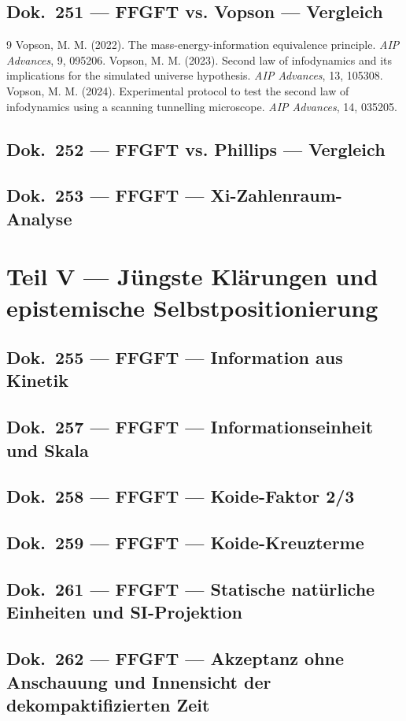	\chapter{Dok.~251 --- FFGFT vs. Vopson — Vergleich}
	
	\begin{thebibliography}{9}
	Vopson, M. M. (2022). The mass-energy-information equivalence principle.
	\emph{AIP Advances}, 9, 095206.
	Vopson, M. M. (2023). Second law of infodynamics and its implications for the
	simulated universe hypothesis. \emph{AIP Advances}, 13, 105308.
	Vopson, M. M. (2024). Experimental protocol to test the second law of
	infodynamics using a scanning tunnelling microscope. \emph{AIP Advances}, 14, 035205.
	\end{thebibliography}
	\chapter{Dok.~252 --- FFGFT vs. Phillips — Vergleich}
	
	\chapter{Dok.~253 --- FFGFT — Xi-Zahlenraum-Analyse}
	
	\part{Teil V --- Jüngste Klärungen und epistemische Selbstpositionierung}
	\chapter{Dok.~255 --- FFGFT — Information aus Kinetik}
	
	\chapter{Dok.~257 --- FFGFT — Informationseinheit und Skala}
	
	\chapter{Dok.~258 --- FFGFT — Koide-Faktor 2/3}
	
	\chapter{Dok.~259 --- FFGFT — Koide-Kreuzterme}
	
	\chapter{Dok.~261 --- FFGFT — Statische natürliche Einheiten und SI-Projektion}
	
	\chapter{Dok.~262 --- FFGFT — Akzeptanz ohne Anschauung und Innensicht der dekompaktifizierten Zeit}
	


